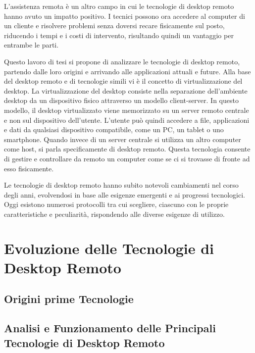 \documentclass[12pt,a4paper,openright,twoside]{book}
\begin{document}
L'assistenza remota è un altro campo in cui le tecnologie di desktop remoto hanno avuto un impatto positivo. I tecnici possono ora accedere al computer di un cliente e risolvere problemi senza doversi recare fisicamente sul posto, riducendo i tempi e i costi di intervento, risultando quindi un vantaggio per entrambe le parti.

Questo lavoro di tesi si propone di analizzare le tecnologie di desktop remoto, partendo dalle loro origini e arrivando alle applicazioni attuali e future. Alla base del desktop remoto e di tecnologie simili vi è il concetto di virtualizzazione del desktop. La virtualizzazione del desktop consiste nella separazione dell'ambiente desktop da un dispositivo fisico attraverso un modello client-server. In questo modello, il desktop virtualizzato viene memorizzato su un server remoto centrale e non sul dispositivo dell'utente. L'utente può quindi accedere a file, applicazioni e dati da qualsiasi dispositivo compatibile, come un PC, un tablet o uno smartphone. %
Quando invece di un server centrale si utilizza un altro computer come host, si parla specificamente di desktop remoto. Questa tecnologia consente di gestire e controllare da remoto un computer come se ci si trovasse di fronte ad esso fisicamente.

Le tecnologie di desktop remoto hanno subito notevoli cambiamenti nel corso degli anni, evolvendosi in base alle esigenze emergenti e ai progressi tecnologici. Oggi esistono numerosi protocolli tra cui scegliere, ciascuno con le proprie caratteristiche e peculiarità, rispondendo alle diverse esigenze di utilizzo.



\chapter{Evoluzione delle Tecnologie di Desktop Remoto}
\label{chap:evolution}

\section{Origini prime Tecnologie}

\section{Analisi e Funzionamento delle Principali Tecnologie di Desktop Remoto}
\end{document}
